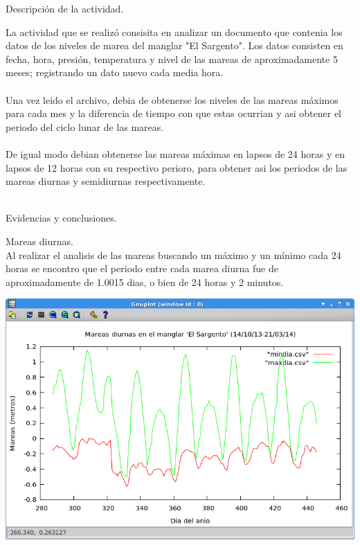 \documentclass[12pt]{article}
\begin{document}
\newpage
\begin{center}
\begin{LARGE}
Descripción de la actividad.
\end{LARGE}
\end{center}

\begin{large}
La actividad que se realizó consisita en analizar un documento que contenia los datos de los niveles de marea del manglar "El Sargento". Los datos consisten en fecha, hora, presión, temperatura y nivel de las mareas de aproximadamente 5 meses; registrando un dato nuevo cada media hora.\\
\\
Una vez leido el archivo, debia de obtenerse los niveles de las mareas m\'{a}ximos para cada mes y la diferencia de tiempo con que estas ocurrian y asi obtener el periodo del ciclo lunar de las mareas.\\
\\
De igual modo debian obtenerse las mareas m\'{a}ximas en lapsos de 24 horas y en lapsos de 12 horas con su respectivo perioro, para obtener asi los periodos de las mareas diurnas y semidiurnas respectivamente.\\
\\
\end{large}

\newpage
\begin{center}
\begin{LARGE}
Evidencias y conclusiones.
\end{LARGE}
\end{center}

\begin{large}
Mareas diurnas.\\
Al realizar el analisis de las mareas buscando un máximo y un mínimo cada 24 horas se encontro que el periodo entre cada marea diurna fue de aproximadamente de 1.0015 dias, o bien de 24 horas y 2 minutos.
\end{large}
\begin{center}
\includegraphics[scale=0.6]{maxymindias.png} 
\end{center}
\end{document}
